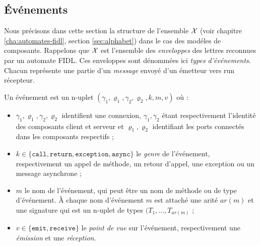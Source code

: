 \subsection{\'Ev\'enements}

Nous pr\'ecisons dans cette section la structure de l'ensemble ${\cal
  X}$ (voir chapitre
  \ref{cha:automates-fidl}, section \ref{sec:alphabet}) dans le cas
  des mod\'eles de composants. Rappelons que $\cal X$ est l'ensemble
  des \emph{enveloppes} des lettres reconnues par un automate FIDL. 
Ces enveloppes sont d\'enomm\'ees ici \emph{types
  d'\'ev\'enements}. Chacun repr\'esente une partie d'un \emph{message}
  envoy\'e d'un \'emetteur vers run r\'ecepteur. 

\begin{definition}[\'Ev\'enement]
\label{sec:evenements}    Un \'ev\'enement est un n-uplet
    $(\gamma_1,\varrho_1,\gamma_2,\varrho_2,k,m,v)$
    o\`u :
\begin{itemize}
  \item $\gamma_1,\varrho_1,\gamma_2,\varrho_2$ identifient  une
    connexion, $\gamma_1,\gamma_2$ 
    \'etant respectivement l'identit\'e des composants client et
    serveur  et $\varrho_1,\varrho_2$ identifiant les ports
    connect\'es dans les composants respectifs ;
  \item $k \in
    \{\mathtt{call},\mathtt{return}, \mathtt{exception},\mathtt{async}\}$
    le \emph{genre} de l'\'ev\'enement, respectivement un appel de m\'ethode,
    un retour d'appel, une exception ou un message asynchrone ;
  \item $m$ le nom de l'\'ev\'enement, qui peut \^etre un nom de m\'ethode
    ou de type d'\'ev\'enement. \`A chaque nom d'\'ev\'enement $m$ est
    attach\'e une arit\'e $ar(m)$ et une signature qui est un
    n-uplet de types $(T_1,\dots, T_{ar(m)}$  ;
  \item $v \in \{\mathtt{emit},\mathtt{receive}\}$ le \emph{point de
  vue} sur l'\'ev\'enement, respectivement une \emph{\'emission} et
  une \emph{r\'eception}.
\end{itemize}
\end{definition}

